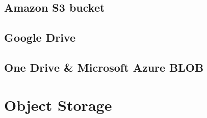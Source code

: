 \documentclass[a4paper,12pt,twoside,openright,titlepage]{book}
\begin{document}
\section{Amazon S3 bucket}
\section{Google Drive}
\section{One Drive \& Microsoft Azure BLOB}

\chapter{Object Storage}


\printindex
\end{document}
